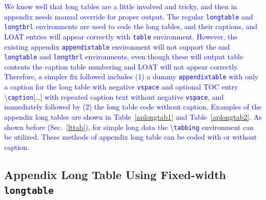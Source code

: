\documentclass[phd]{ndsu-thesis-2022}
\newcommand\italk[1]{\textcolor{blue}{#1}}  %
\newcommand\cmd[1]{\textbackslash\texttt{#1}}  %
\newcommand\vb[1]{\textcolor{blue}{\texttt{#1}}}%
\begin{document}
\italk{We know well that long tables are a little involved and tricky, and then in appendix needs manual override for proper output. The regular \vb{longtable} and \vb{longtbrl} environments are used to code the long tables, and their captions, and LOAT entries will appear correctly with \vb{table} environment. However, the existing appendix \vb{appendixtable} environment will not support the and \vb{longtable} and \vb{longtbrl} environments, even though these will output table contents the caption table numbering and LOAT will not appear correctly. Therefore, a simpler fix followed includes (1) a dummy \vb{appendixtable} with only a caption for the long table with negative \vb{vspace} and optional TOC entry \cmd{caption}[\ldots] with repeated caption text without negative \vb{vspace}, and immediately followed by (2) the long table code without caption. Examples of the appendix long tables are shown in Table~\ref{aplongtab1} and Table~\ref{aplongtab2}. As shown before (Sec.~\ref{lttab}), for simple long data the \cmd{tabbing} environment can be utilized. These methods of appendix long table can be coded with or without caption.}  


\subsection{Appendix Long Table Using Fixed-width \texttt{longtable}}
\end{document}
